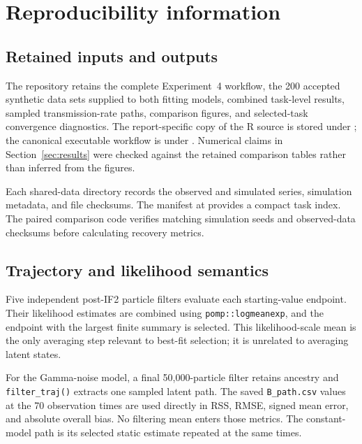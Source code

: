 \section{Reproducibility information}
\label{app:reproducibility}

\subsection{Retained inputs and outputs}

The repository retains the complete Experiment~4 workflow, the 200 accepted
synthetic data sets supplied to both fitting models, combined task-level
results, sampled transmission-rate paths, comparison figures, and selected-task
convergence diagnostics.  The report-specific copy of the R source is stored
under ; the canonical executable workflow
is under
.  Numerical
claims in Section~\ref{sec:results} were checked against the retained comparison
tables rather than inferred from the figures.

Each shared-data directory records the observed and simulated series,
simulation metadata, and file checksums.  The manifest at
provides a compact task index.  The paired comparison code verifies matching
simulation seeds and observed-data checksums before calculating recovery
metrics.

\subsection{Trajectory and likelihood semantics}

Five independent post-IF2 particle filters evaluate each starting-value
endpoint.  Their likelihood estimates are combined using
\texttt{pomp::logmeanexp}, and the endpoint with the largest finite summary is
selected.  This likelihood-scale mean is the only averaging step relevant to
best-fit selection; it is unrelated to averaging latent states.

For the Gamma-noise model, a final 50,000-particle filter retains ancestry and
\texttt{filter\_traj()} extracts one sampled latent path.  The saved
\texttt{B\_path.csv} values at the 70 observation times are used directly in
RSS, RMSE, signed mean error, and absolute overall bias.  No filtering mean
enters those metrics.  The constant-model path is its selected static estimate
repeated at the same times.

